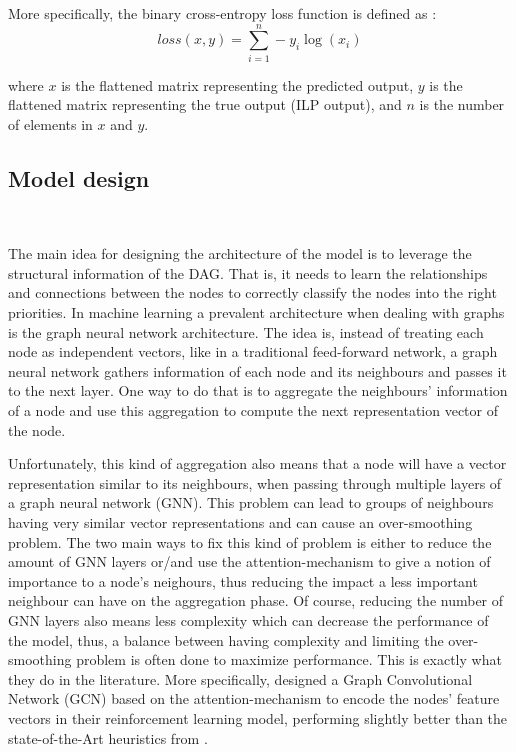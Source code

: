 More specifically, the binary cross-entropy loss function is defined as :
\begin{equation}
    loss(x, y) = \sum_{i=1}^{n} -y_i\log(x_i)
\end{equation}
    
where $x$ is the flattened matrix representing the predicted output,
$y$ is the flattened matrix representing the true output (ILP output),
and $n$ is the number of elements in $x$ and $y$.


\subsection{Model design}
~
\label{sec:model_design}

The main idea for designing the architecture of the model is 
to leverage the structural information of the DAG.
That is, it needs to learn the relationships and connections
between the nodes to correctly classify the nodes into the right priorities.
In machine learning a prevalent architecture when dealing with graphs
is the graph neural network architecture.
The idea is, instead of treating each node as independent vectors, like 
in a traditional feed-forward network, 
a graph neural network gathers information of each node and its neighbours 
and passes it to the next layer.
One way to do that is to aggregate the neighbours' information of a node
and use this aggregation to compute the next representation vector of the node.

Unfortunately, this kind of aggregation also means that a node will have a 
vector representation similar to its neighbours, when passing through multiple layers of a graph neural network (GNN).
This problem can lead to groups of neighbours having very similar vector representations
and can cause an over-smoothing problem\cite{chen2020oversmoothing}.
The two main ways to fix this kind of problem is either to reduce the amount of GNN layers 
or/and use the attention-mechanism to give a notion of importance to a node's neighours,
thus reducing the impact a less important neighbour can have on the aggregation phase.
Of course, reducing the number of GNN layers also means less complexity which can decrease the performance of the model,
thus, a balance between having complexity and limiting the over-smoothing problem is often done to maximize performance.
This is exactly what they do in the literature\cite{Lee2021GlobalDagSchedDRL}\cite{Zhao2024GATDRLmodel}.
More specifically, \citet{Lee2021GlobalDagSchedDRL} designed a Graph Convolutional Network (GCN) based on the attention-mechanism
to encode the nodes' feature vectors in their reinforcement learning model, performing slightly better than the state-of-the-Art
heuristics from \citet{zhao2020DAGsched}.

